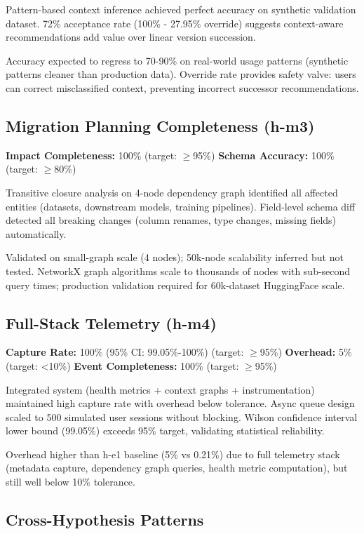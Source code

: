 Pattern-based context inference achieved perfect accuracy on synthetic validation dataset. 72\% acceptance rate (100\% - 27.95\% override) suggests context-aware recommendations add value over linear version succession.

Accuracy expected to regress to 70-90\% on real-world usage patterns (synthetic patterns cleaner than production data). Override rate provides safety valve: users can correct misclassified context, preventing incorrect successor recommendations.

\subsection{Migration Planning Completeness (h-m3)}

\textbf{Impact Completeness:} 100\% (target: $\geq$95\%)
\textbf{Schema Accuracy:} 100\% (target: $\geq$80\%)

Transitive closure analysis on 4-node dependency graph identified all affected entities (datasets, downstream models, training pipelines). Field-level schema diff detected all breaking changes (column renames, type changes, missing fields) automatically.

Validated on small-graph scale (4 nodes); 50k-node scalability inferred but not tested. NetworkX graph algorithms scale to thousands of nodes with sub-second query times; production validation required for 60k-dataset HuggingFace scale.

\subsection{Full-Stack Telemetry (h-m4)}

\textbf{Capture Rate:} 100\% (95\% CI: 99.05\%-100\%) (target: $\geq$95\%)
\textbf{Overhead:} 5\% (target: <10\%)
\textbf{Event Completeness:} 100\% (target: $\geq$95\%)

Integrated system (health metrics + context graphs + instrumentation) maintained high capture rate with overhead below tolerance. Async queue design scaled to 500 simulated user sessions without blocking. Wilson confidence interval lower bound (99.05\%) exceeds 95\% target, validating statistical reliability.

Overhead higher than h-e1 baseline (5\% vs 0.21\%) due to full telemetry stack (metadata capture, dependency graph queries, health metric computation), but still well below 10\% tolerance.

\subsection{Cross-Hypothesis Patterns}


